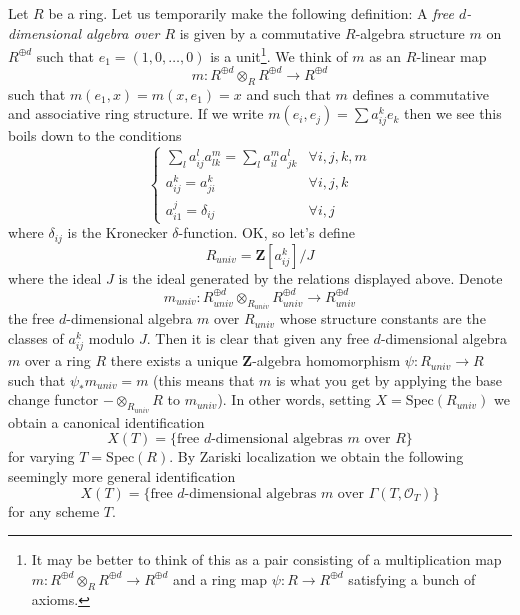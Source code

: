 \medskip\noindent
Let $R$ be a ring. Let us temporarily make the following definition:
A {\it free $d$-dimensional algebra over $R$}
is given by a commutative $R$-algebra structure $m$ on $R^{\oplus d}$
such that $e_1 = (1, 0, \ldots, 0)$ is a unit\footnote{It may be better
to think of this as a pair consisting of a multiplication map
$m : R^{\oplus d} \otimes_R R^{\oplus d} \to R^{\oplus d}$ and
a ring map $\psi : R \to R^{\oplus d}$ satisfying a bunch of axioms.}.
We think of $m$ as an $R$-linear map
$$
m : R^{\oplus d} \otimes_R R^{\oplus d} \longrightarrow R^{\oplus d}
$$
such that $m(e_1, x) = m(x, e_1) = x$ and such that $m$ defines a
commutative and associative ring structure. If we write
$m(e_i, e_j) = \sum a_{ij}^ke_k$ then we see this boils down
to the conditions
$$
\left\{
\begin{matrix}
\sum_l a_{ij}^la_{lk}^m = \sum_l a_{il}^ma_{jk}^l & \forall i, j, k, m \\
a_{ij}^k = a_{ji}^k & \forall i,j,k \\
a_{i1}^j = \delta_{ij} & \forall i, j
\end{matrix}
\right.
$$
where $\delta_{ij}$ is the Kronecker $\delta$-function. OK, so let's define
$$
R_{univ} = \mathbf{Z}[a_{ij}^k]/J
$$
where the ideal $J$ is the ideal generated by the relations displayed above.
Denote
$$
m_{univ} :
R_{univ}^{\oplus d} \otimes_{R_{univ}} R_{univ}^{\oplus d}
\longrightarrow
R_{univ}^{\oplus d}
$$
the free $d$-dimensional algebra $m$ over $R_{univ}$ whose structure
constants are the classes of $a_{ij}^k$ modulo $J$.
Then it is clear that given any free $d$-dimensional algebra $m$ over a ring
$R$ there exists a unique $\mathbf{Z}$-algebra homomorphism
$\psi : R_{univ} \to R$ such that $\psi_*m_{univ} = m$ (this means that
$m$ is what you get by applying the base change functor
$- \otimes_{R_{univ}} R$ to $m_{univ}$). In other words, setting
$X = \text{Spec}(R_{univ})$ we obtain a canonical identification
$$
X(T) = \{\text{free }d\text{-dimensional algebras }m\text{ over }R\}
$$
for varying $T = \text{Spec}(R)$. By Zariski localization we obtain
the following seemingly more general identification
\begin{equation}
\label{equation-objects}
X(T) = \{\text{free }d\text{-dimensional algebras }
m\text{ over }\Gamma(T, \mathcal{O}_T)\}
\end{equation}
for any scheme $T$.

